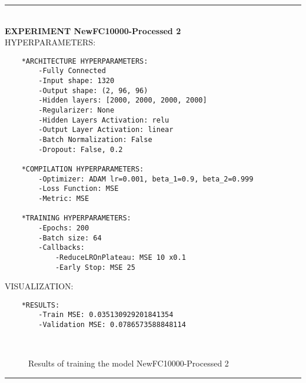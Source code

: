 \rule{0.5\textwidth}{0.5pt}\\

	{\large \textbf{EXPERIMENT NewFC10000-Processed 2}}\\
	
	{\normalsize HYPERPARAMETERS:}\\
	\begin{lstlisting}	
	*ARCHITECTURE HYPERPARAMETERS:
		-Fully Connected
		-Input shape: 1320
		-Output shape: (2, 96, 96)
		-Hidden layers: [2000, 2000, 2000, 2000]
		-Regularizer: None
		-Hidden Layers Activation: relu
		-Output Layer Activation: linear
		-Batch Normalization: False
		-Dropout: False, 0.2
	
	*COMPILATION HYPERPARAMETERS:
		-Optimizer: ADAM lr=0.001, beta_1=0.9, beta_2=0.999
		-Loss Function: MSE
		-Metric: MSE
	
	*TRAINING HYPERPARAMETERS:
		-Epochs: 200
		-Batch size: 64
		-Callbacks: 
			-ReduceLROnPlateau: MSE 10 x0.1
			-Early Stop: MSE 25
	\end{lstlisting}
	
	{\normalsize VISUALIZATION:}
	\begin{lstlisting}
	*RESULTS:
        -Train MSE: 0.035130929201841354
        -Validation MSE: 0.0786573588848114
	\end{lstlisting}
	
	\begin{figure*}[ht!]
		\hspace{\fill}
		\hspace{\fill}
		\\
		\caption{Results of training the model NewFC10000-Processed 2}
	\end{figure*}

\FloatBarrier
\rule{0.5\textwidth}{0.5pt}\\
	